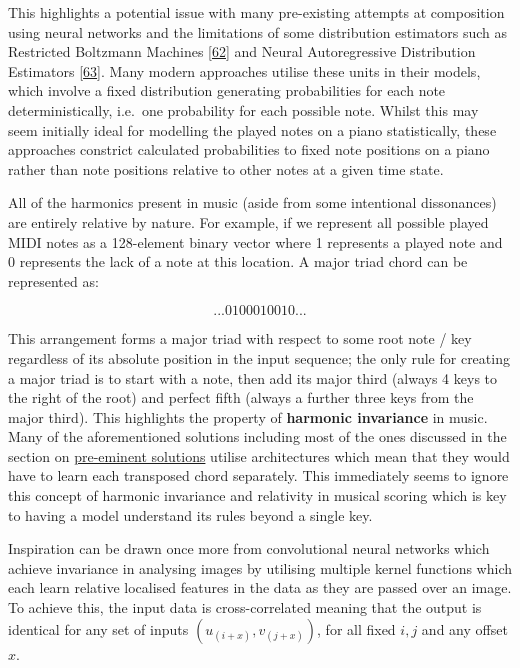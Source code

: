 \documentclass[12pt,]{article}
\begin{document}
This highlights a potential issue with many pre-existing attempts at
composition using neural networks and the limitations of some
distribution estimators such as Restricted Boltzmann Machines
{[}\protect\hyperlink{ref-sutskever2009recurrent}{62}{]} and Neural
Autoregressive Distribution Estimators
{[}\protect\hyperlink{ref-uria2016neural}{63}{]}. Many modern approaches
utilise these units in their models, which involve a fixed distribution
generating probabilities for each note deterministically, i.e.~one
probability for each possible note. Whilst this may seem initially ideal
for modelling the played notes on a piano statistically, these
approaches constrict calculated probabilities to fixed note positions on
a piano rather than note positions relative to other notes at a given
time state.

All of the harmonics present in music (aside from some intentional
dissonances) are entirely relative by nature. For example, if we
represent all possible played MIDI notes as a 128-element binary vector
where 1 represents a played note and 0 represents the lack of a note at
this location. A major triad chord can be represented as:

\[... 0100010010 ...\]

This arrangement forms a major triad with respect to some root note /
key regardless of its absolute position in the input sequence; the only
rule for creating a major triad is to start with a note, then add its
major third (always 4 keys to the right of the root) and perfect fifth
(always a further three keys from the major third). This highlights the
property of \textbf{harmonic invariance} in music. Many of the
aforementioned solutions including most of the ones discussed in the
section on \protect\hyperlink{competitiveexistingsolutions}{pre-eminent
solutions} utilise architectures which mean that they would have to
learn each transposed chord separately. This immediately seems to ignore
this concept of harmonic invariance and relativity in musical scoring
which is key to having a model understand its rules beyond a single key.

Inspiration can be drawn once more from convolutional neural networks
which achieve invariance in analysing images by utilising multiple
kernel functions which each learn relative localised features in the
data as they are passed over an image. To achieve this, the input data
is cross-correlated meaning that the output is identical for any set of
inputs \((u_{(i + x)}, v_{(j+x)})\), for all fixed \(i,j\) and any
offset \(x\).
\end{document}
